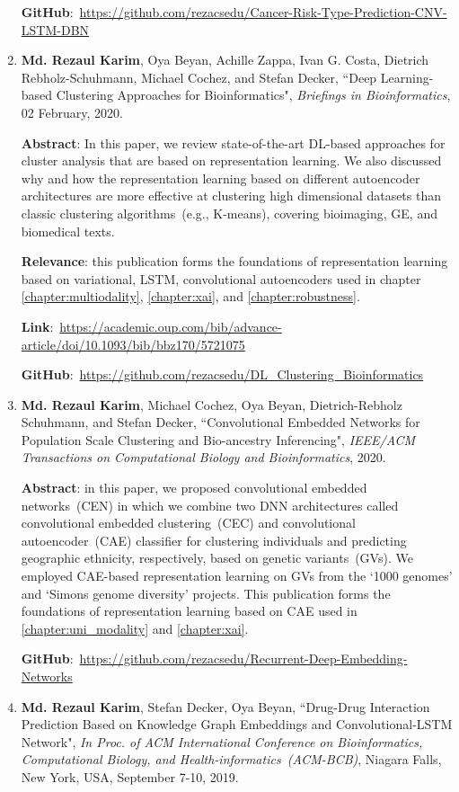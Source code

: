 \begin{enumerate}
	\textbf{GitHub}:~\url{https://github.com/rezacsedu/Cancer-Risk-Type-Prediction-CNV-LSTM-DBN}
	
	\item \textbf{Md. Rezaul Karim}, Oya Beyan, Achille Zappa, Ivan G. Costa, Dietrich Rebholz-Schuhmann, Michael Cochez, and Stefan Decker, ``Deep Learning-based Clustering Approaches for Bioinformatics", \emph{Briefings in Bioinformatics}, 02 February, 2020.
	
	\textbf{Abstract}: In this paper, we review state-of-the-art DL-based approaches for cluster analysis that are based on representation learning. We also discussed why and how the representation learning based on different autoencoder architectures are more effective at clustering high dimensional datasets than classic clustering algorithms~(e.g., K-means), covering bioimaging, GE, and biomedical texts. 
	
	\textbf{Relevance}: this publication forms the foundations of representation learning based on variational, LSTM, convolutional autoencoders used in chapter \ref{chapter:multiodality}, \ref{chapter:xai}, and \ref{chapter:robustness}.

	\textbf{Link}:~\url{https://academic.oup.com/bib/advance-article/doi/10.1093/bib/bbz170/5721075}
	
	\textbf{GitHub}:~\url{https://github.com/rezacsedu/DL_Clustering_Bioinformatics}
	
	\item \textbf{Md. Rezaul Karim}, Michael Cochez, Oya Beyan, Dietrich-Rebholz Schuhmann, and Stefan Decker, ``Convolutional Embedded Networks for Population Scale Clustering and Bio-ancestry Inferencing", \emph{IEEE/ACM Transactions on Computational Biology and Bioinformatics}, 2020.
	
	\textbf{Abstract}: in this paper, we proposed convolutional embedded networks~(CEN) in which we combine two DNN architectures called convolutional embedded clustering~(CEC) and convolutional autoencoder~(CAE) classifier for clustering individuals and predicting geographic ethnicity, respectively, based on genetic variants~(GVs). We employed CAE-based representation learning on GVs from the `1000 genomes' and `Simons genome diversity' projects. This publication forms the foundations of representation learning based on CAE used in \cref{chapter:uni_modality} and \cref{chapter:xai}.

	\textbf{GitHub}:~\url{https://github.com/rezacsedu/Recurrent-Deep-Embedding-Networks}
	
	\item \textbf{Md. Rezaul Karim}, Stefan Decker, Oya Beyan, ``Drug-Drug Interaction Prediction Based on Knowledge Graph Embeddings and Convolutional-LSTM Network", \emph{In Proc. of ACM International Conference on Bioinformatics, Computational Biology, and Health-informatics~(ACM-BCB)}, Niagara Falls, New York, USA, September 7-10, 2019.
	

\end{enumerate}
